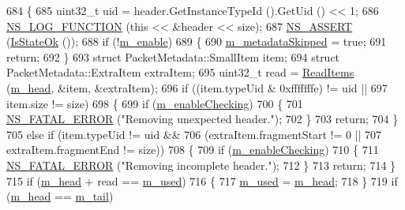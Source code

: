 \begin{DoxyCode}
684 \{
685   uint32\_t uid = header.GetInstanceTypeId ().GetUid () << 1;
686   \hyperlink{log-macros-disabled_8h_a90b90d5bad1f39cb1b64923ea94c0761}{NS\_LOG\_FUNCTION} (\textcolor{keyword}{this} << &header << size);
687   \hyperlink{assert_8h_a6dccdb0de9b252f60088ce281c49d052}{NS\_ASSERT} (\hyperlink{classns3_1_1PacketMetadata_a208d3163e28704438cdd4d30318e489c}{IsStateOk} ());
688   \textcolor{keywordflow}{if} (!\hyperlink{classns3_1_1PacketMetadata_a666ea556ffbd8f2226195cde1abe7ae7}{m\_enable}) 
689     \{
690       \hyperlink{classns3_1_1PacketMetadata_ac370960e8881e5a7280122e9dc5f7ace}{m\_metadataSkipped} = \textcolor{keyword}{true};
691       \textcolor{keywordflow}{return};
692     \}
693   \textcolor{keyword}{struct }PacketMetadata::SmallItem item;
694   \textcolor{keyword}{struct }PacketMetadata::ExtraItem extraItem;
695   uint32\_t read = \hyperlink{classns3_1_1PacketMetadata_a3719ad2c32313a9a1c74462322e8b517}{ReadItems} (\hyperlink{classns3_1_1PacketMetadata_a46b3ef0a9a80a798ad1e81b5694a5658}{m\_head}, &item, &extraItem);
696   \textcolor{keywordflow}{if} ((item.typeUid & 0xfffffffe) != uid ||
697       item.size != size)
698     \{
699       \textcolor{keywordflow}{if} (\hyperlink{classns3_1_1PacketMetadata_a3b4333cb8df79817e7ca74de1a090d89}{m\_enableChecking})
700         \{
701           \hyperlink{group__fatal_ga5131d5e3f75d7d4cbfd706ac456fdc85}{NS\_FATAL\_ERROR} (\textcolor{stringliteral}{"Removing unexpected header."});
702         \}
703       \textcolor{keywordflow}{return};
704     \}
705   \textcolor{keywordflow}{else} \textcolor{keywordflow}{if} (item.typeUid != uid &&
706            (extraItem.fragmentStart != 0 ||
707             extraItem.fragmentEnd != size))
708     \{
709       \textcolor{keywordflow}{if} (\hyperlink{classns3_1_1PacketMetadata_a3b4333cb8df79817e7ca74de1a090d89}{m\_enableChecking})
710         \{
711           \hyperlink{group__fatal_ga5131d5e3f75d7d4cbfd706ac456fdc85}{NS\_FATAL\_ERROR} (\textcolor{stringliteral}{"Removing incomplete header."});
712         \}
713       \textcolor{keywordflow}{return};
714     \}
715   \textcolor{keywordflow}{if} (\hyperlink{classns3_1_1PacketMetadata_a46b3ef0a9a80a798ad1e81b5694a5658}{m\_head} + read == \hyperlink{classns3_1_1PacketMetadata_afeecb22fe6f3368f3c56bda755892df9}{m\_used})
716     \{
717       \hyperlink{classns3_1_1PacketMetadata_afeecb22fe6f3368f3c56bda755892df9}{m\_used} = \hyperlink{classns3_1_1PacketMetadata_a46b3ef0a9a80a798ad1e81b5694a5658}{m\_head};
718     \}
719   \textcolor{keywordflow}{if} (\hyperlink{classns3_1_1PacketMetadata_a46b3ef0a9a80a798ad1e81b5694a5658}{m\_head} == \hyperlink{classns3_1_1PacketMetadata_ad24a659e236af7b98c475c97c4f60db9}{m\_tail})

\end{DoxyCode}
